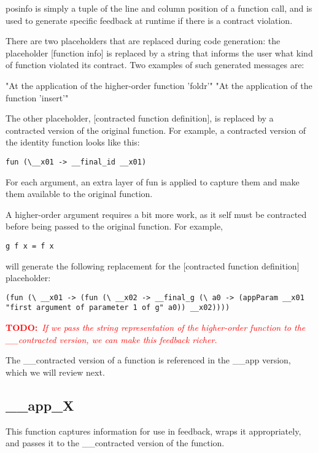 \documentclass[10pt,a4paper]{article}
\newcommand{\annotate}[3]{
	\begin{scriptsize}
	\textcolor{#1}{\textbf{#2}~\textit{#3}}
	\end{scriptsize}\newline}
\newcommand{\todo}[1]{\annotate{red} {TODO:} {#1}}
\begin{document}
posinfo is simply a tuple of the line and column position of a function call, and is used to generate specific feedback at runtime if there is a contract violation.

There are two placeholders that are replaced during code generation:
the placeholder [function info] is replaced by a string that informs the user what kind of function violated its contract.
Two examples of such generated messages are:

"At the application of the higher-order function 'foldr'"
"At the application of the function 'insert'"

The other placeholder, [contracted function definition], is replaced by a contracted version of the original function.
For example, a contracted version of the identity function looks like this:

\begin{lstlisting}
fun (\__x01 -> __final_id __x01)
\end{lstlisting}

For each argument, an extra layer of fun is applied to capture them and make them available to the original function.

A higher-order argument requires a bit more work, as it self must be contracted before being passed to the original function.
For example,

\begin{lstlisting}
g f x = f x
\end{lstlisting}

will generate the following replacement for the [contracted function definition] placeholder:

\begin{lstlisting}
(fun (\ __x01 -> (fun (\ __x02 -> __final_g (\ a0 -> (appParam __x01 "first argument of parameter 1 of g" a0)) __x02))))
\end{lstlisting}

\todo{If we pass the string representation of the higher-order function to the \_\_contracted version, we can make this feedback richer.}

The \_\_contracted version of a function is referenced in the \_\_app version, which we will review next.

\subsection{\_\_app\_X}

This function captures information for use in feedback, wraps it appropriately, and passes it to the \_\_contracted version of the function.
\end{document}

